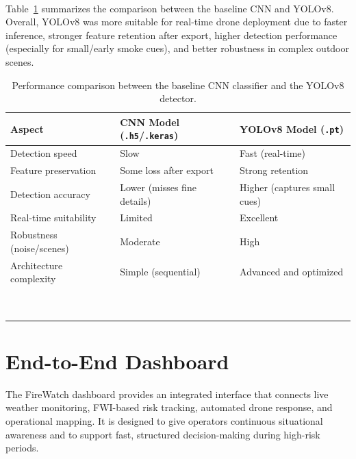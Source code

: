 \documentclass[11pt,a4paper]{report}
\begin{document}
\paragraph{}
Table~\ref{tab:cnn-yolo-comparison} summarizes the comparison between the baseline CNN and YOLOv8. Overall, YOLOv8 was more suitable for real-time drone deployment due to faster inference, stronger feature retention after export, higher detection performance (especially for small/early smoke cues), and better robustness in complex outdoor scenes.

\begin{table}[h!]
\centering
\caption{Performance comparison between the baseline CNN classifier and the YOLOv8 detector.\\ } 
\label{tab:cnn-yolo-comparison}
\small
\begin{tabular}{@{}lll@{}}
\toprule
Aspect & CNN Model (\texttt{.h5}/\texttt{.keras}) & YOLOv8 Model (\texttt{.pt}) \\
\midrule
Detection speed        & Slow              & Fast (real-time)  \\
Feature preservation   & Some loss after export & Strong retention \\
Detection accuracy     & Lower (misses fine details) & Higher (captures small cues)  \\
Real-time suitability  & Limited           & Excellent  \\
Robustness (noise/scenes) & Moderate        & High     \\
Architecture complexity & Simple (sequential) & Advanced and optimized  \\
\bottomrule
\\ \\ \\ \\ \\ \\ \\ \\ \\ 
\end{tabular}
\end{table}


\section{End-to-End Dashboard}
\label{subsec:end-to-end-dashboard}

The FireWatch dashboard provides an integrated interface that connects live weather monitoring, FWI-based risk tracking, automated drone response, and operational mapping. It is designed to give operators continuous situational awareness and to support fast, structured decision-making during high-risk periods.
\end{document}
